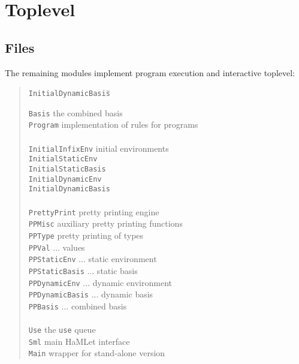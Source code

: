 \documentclass[twoside,titlepage]{article}
\begin{document}
\section{Toplevel}
\label{toplevel}

\subsection{Files}
\label{toplevelfiles}

The remaining modules implement program execution and interactive toplevel:

\begin{quote}
\begin{tabbing}
{\tt InitialDynamicBasis}\qquad\= \kill

{\tt Basis}			\> the combined basis \\
{\tt Program}			\> implementation of rules for programs \\
\\
{\tt InitialInfixEnv}		\> initial environments \\
{\tt InitialStaticEnv}		\> \\
{\tt InitialStaticBasis}	\> \\
{\tt InitialDynamicEnv}		\> \\
{\tt InitialDynamicBasis}	\> \\
\\
{\tt PrettyPrint}		\> pretty printing engine \\
{\tt PPMisc}			\> auxiliary pretty printing functions \\
{\tt PPType}			\> pretty printing of types \\
{\tt PPVal}			\> ... values \\
{\tt PPStaticEnv}		\> ... static environment \\
{\tt PPStaticBasis}		\> ... static basis \\
{\tt PPDynamicEnv}		\> ... dynamic environment \\
{\tt PPDynamicBasis}		\> ... dynamic basis \\
{\tt PPBasis}			\> ... combined basis \\
\\
{\tt Use}			\> the {\tt use} queue \\
{\tt Sml}			\> main HaMLet interface \\
{\tt Main}			\> wrapper for stand-alone version \\
\end{tabbing}
\end{quote}
\end{document}
